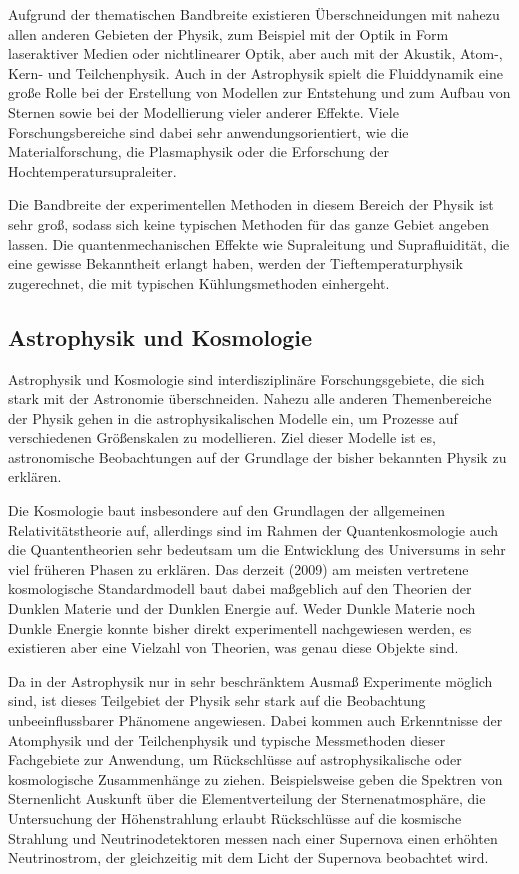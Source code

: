 \documentclass[titlepage, parkskip=full, twocolumn, landscape]{scrartcl}
\begin{document}
Aufgrund der thematischen Bandbreite existieren Überschneidungen mit nahezu allen anderen Gebieten der Physik, zum Beispiel mit der Optik in Form laseraktiver Medien oder nichtlinearer Optik, aber auch mit der Akustik, Atom-, Kern- und Teilchenphysik. Auch in der Astrophysik spielt die Fluiddynamik eine große Rolle bei der Erstellung von Modellen zur Entstehung und zum Aufbau von Sternen sowie bei der Modellierung vieler anderer Effekte. Viele Forschungsbereiche sind dabei sehr anwendungsorientiert, wie die Materialforschung, die Plasmaphysik oder die Erforschung der Hochtemperatursupraleiter.

Die Bandbreite der experimentellen Methoden in diesem Bereich der Physik ist sehr groß, sodass sich keine typischen Methoden für das ganze Gebiet angeben lassen. Die quantenmechanischen Effekte wie Supraleitung und Suprafluidität, die eine gewisse Bekanntheit erlangt haben, werden der Tieftemperaturphysik zugerechnet, die mit typischen Kühlungsmethoden einhergeht.

\subsection{Astrophysik und Kosmologie}

Astrophysik und Kosmologie sind interdisziplinäre Forschungsgebiete, die sich stark mit der Astronomie überschneiden. Nahezu alle anderen Themenbereiche der Physik gehen in die astrophysikalischen Modelle ein, um Prozesse auf verschiedenen Größenskalen zu modellieren. Ziel dieser Modelle ist es, astronomische Beobachtungen auf der Grundlage der bisher bekannten Physik zu erklären.

Die Kosmologie baut insbesondere auf den Grundlagen der allgemeinen Relativitätstheorie auf, allerdings sind im Rahmen der Quantenkosmologie auch die Quantentheorien sehr bedeutsam um die Entwicklung des Universums in sehr viel früheren Phasen zu erklären. Das derzeit (2009) am meisten vertretene kosmologische Standardmodell baut dabei maßgeblich auf den Theorien der Dunklen Materie und der Dunklen Energie auf. Weder Dunkle Materie noch Dunkle Energie konnte bisher direkt experimentell nachgewiesen werden, es existieren aber eine Vielzahl von Theorien, was genau diese Objekte sind.

Da in der Astrophysik nur in sehr beschränktem Ausmaß Experimente möglich sind, ist dieses Teilgebiet der Physik sehr stark auf die Beobachtung unbeeinflussbarer Phänomene angewiesen. Dabei kommen auch Erkenntnisse der Atomphysik und der Teilchenphysik und typische Messmethoden dieser Fachgebiete zur Anwendung, um Rückschlüsse auf astrophysikalische oder kosmologische Zusammenhänge zu ziehen. Beispielsweise geben die Spektren von Sternenlicht Auskunft über die Elementverteilung der Sternenatmosphäre, die Untersuchung der Höhenstrahlung erlaubt Rückschlüsse auf die kosmische Strahlung und Neutrinodetektoren messen nach einer Supernova einen erhöhten Neutrinostrom, der gleichzeitig mit dem Licht der Supernova beobachtet wird.
\end{document}
